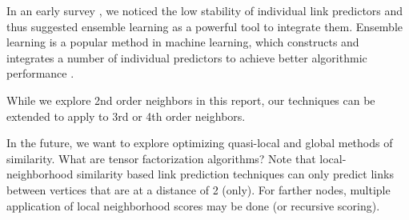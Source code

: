 In an early survey \cite{lu2011link}, we noticed the low stability of individual link predictors and thus suggested ensemble learning as a powerful tool to integrate them. Ensemble learning is a popular method in machine learning, which constructs and integrates a number of individual predictors to achieve better algorithmic performance \cite{zhou2012ensemble}.

While we explore 2nd order neighbors in this report, our techniques can be extended to apply to 3rd or 4th order neighbors.

In the future, we want to explore optimizing quasi-local and global methods of similarity. What are tensor factorization algorithms? Note that local-neighborhood similarity based link prediction techniques can only predict links between vertices that are at a distance of 2 (only). For farther nodes, multiple application of local neighborhood scores may be done (or recursive scoring).
